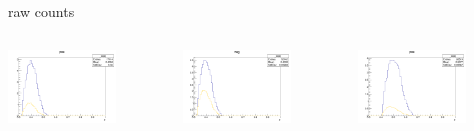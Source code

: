 \begin{frame}{raw counts}
\begin{columns}
\begin{column}[T]{0.25\textwidth}
\includegraphics[width = 0.7\textwidth]{results/yield/statistics/yield_x_Q2_z_0.65_5.500_0.40_pos.png}
\end{column}
\begin{column}[T]{0.25\textwidth}
\includegraphics[width = 0.7\textwidth]{results/yield/statistics/yield_x_Q2_z_0.65_5.500_0.40_neg.png}
\end{column}
\begin{column}[T]{0.25\textwidth}
\includegraphics[width = 0.7\textwidth]{results/yield/statistics/yield_x_Q2_z_0.65_5.500_0.50_pos.png}

\end{column}
\end{columns}
\end{frame}
